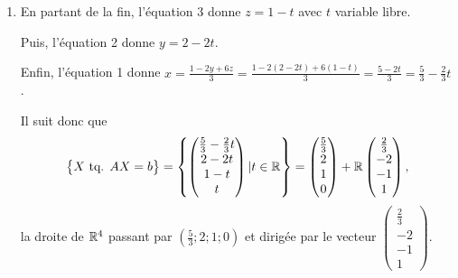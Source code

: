 {\begin{enumerate}
		La matrice $A$ est donc échelonnée en lignes.
		\item
		En partant de la fin, l'équation 3 donne $z = 1-t$ avec $t$ variable libre.
		
		Puis, l'équation 2 donne $y = 2-2t$.
		
		Enfin, l'équation 1 donne $x = \frac{1-2y+6z}3 = \frac{1-2(2-2t)+6(1-t)}3 = \frac{5 -2t}3 = \frac53 - \frac23 t$.
		
		Il suit donc que
			\[ \bigl\{ X \text{ tq. } AX=b \bigr\} = \left\{ \begin{pmatrix}\frac53 - \frac23 t \\ 2-2t \\ 1-t \\ t \end{pmatrix} | t\in\mathbb{R} \right\} = \begin{pmatrix}\frac53 \\ 2 \\ 1 \\ 0 \end{pmatrix} + \mathbb{R} \begin{pmatrix}\frac23 \\ -2 \\ -1 \\ 1 \end{pmatrix}, \]
		la droite de $\mathbb{R}^4$ passant par $(\frac53;2;1;0)$ et dirigée par le vecteur $\begin{pmatrix}\frac23 \\ -2 \\ -1 \\ 1 \end{pmatrix}$.
	\end{enumerate}
}


